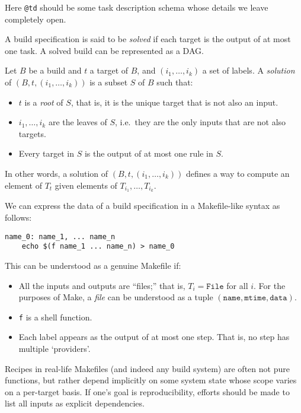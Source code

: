 Here \texttt{@td} should be some task description schema whose details
we leave completely open.

A build specification is said to be \emph{solved} if each target is the
output of at most one task. A solved build can be represented as a DAG.

Let \(B\) be a build and \(t\) a target of \(B\), and
\((i_1,\ldots,i_k)\) a set of labels. A \emph{solution} of
\((B,t,(i_1,\ldots,i_k))\) is a subset \(S\) of \(B\) such that:

\begin{itemize}
\tightlist
\item
  \(t\) is a \emph{root} of \(S\), that is, it is the unique target that
  is not also an input.
\item
  \(i_1,\ldots,i_k\) are the leaves of \(S\), i.e.~they are the only
  inputs that are not also targets.
\item
  Every target in \(S\) is the output of at most one rule in \(S\).
\end{itemize}

In other words, a solution of \((B,t,(i_1,\ldots,i_k))\) defines a way
to compute an element of \(T_t\) given elements of
\(T_{i_1},\ldots,T_{i_k}\).

\begin{example}
  We can express the data of a build specification in a Makefile-like syntax as follows:

\begin{verbatim}
name_0: name_1, ... name_n
    echo $(f name_1 ... name_n) > name_0
\end{verbatim}

This can be understood as a genuine Makefile if:

\begin{itemize}
\tightlist
\item
  All the inputs and outputs are ``files;'' that is,
  \(T_i=\mathtt{File}\) for all \(i\). For the purposes of Make, a
  \emph{file} can be understood as a tuple
  \((\mathtt{name},\mathtt{mtime}, \mathtt{data})\).
\item
  \texttt{f} is a shell function.
\item
  Each label appears as the output of at most one step. That is, no step has multiple `providers'.
\end{itemize}

  Recipes in real-life Makefiles (and indeed any build system) are often not pure functions, but rather depend implicitly on some system state whose scope varies on a per-target basis. 
  If one's goal is reproducibility, efforts should be made to list all inputs as explicit dependencies.
\end{example}

